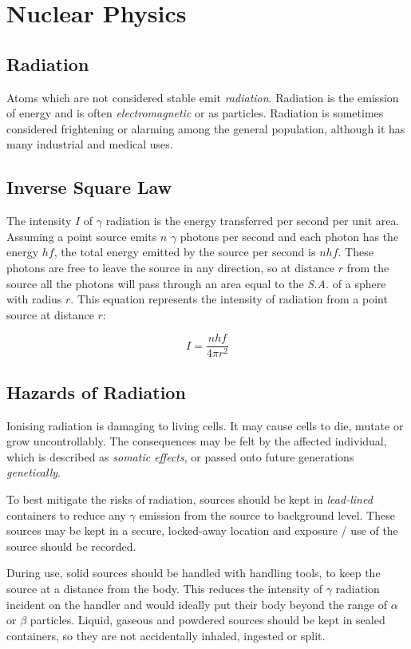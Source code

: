 \documentclass[12pt]{article}
\begin{document}
\section{Nuclear Physics}
\label{sec:orgddf0733}
\subsection{Radiation}
\label{sec:orgf74dd5b}

Atoms which are not considered stable emit \emph{radiation}. Radiation is the emission of energy and is often \emph{electromagnetic} or as particles. Radiation is sometimes considered frightening or alarming among the general population, although it has many industrial and medical uses.

\subsection{Inverse Square Law}
\label{sec:org39da0e7}

The intensity \(I\) of \(\gamma\) radiation is the energy transferred per second per unit area. Assuming a point source emits \(n\) \(\gamma\) photons per second and each photon has the energy \(hf\), the total energy emitted by the source per second is \(nhf\). These photons are free to leave the source in any direction, so at distance \(r\) from the source all the photons will pass through an area equal to the \emph{S.A.} of a sphere with radius \(r\). This equation represents the intensity of radiation from a point source at distance \(r\):

\[I = \dfrac{nhf}{4 \pi r^2}\]

\subsection{Hazards of Radiation}
\label{sec:orgdd8fd54}

Ionising radiation is damaging to living cells. It may cause cells to die, mutate or grow uncontrollably. The consequences may be felt by the affected individual, which is described as \emph{somatic effects}, or passed onto future generations \emph{genetically}.

To best mitigate the risks of radiation, sources should be kept in \emph{lead-lined} containers to reduce any \(\gamma\) emission from the source to background level. These sources may be kept in a secure, locked-away location and exposure / use of the source should be recorded.

During use, solid sources should be handled with handling tools, to keep the source at a distance from the body. This reduces the intensity of \(\gamma\) radiation incident on the handler and would ideally put their body beyond the range of \(\alpha\) or \(\beta\) particles. Liquid, gaseous and powdered sources should be kept in sealed containers, so they are not accidentally inhaled, ingested or split.
\end{document}
